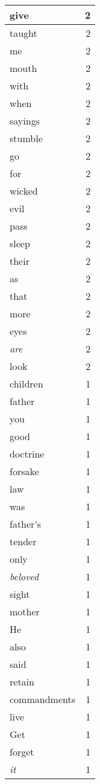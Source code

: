 \begin{center}
\begin{longtable}{l|r}
give & 2\\ \hline 
taught & 2\\ \hline 
me & 2\\ \hline 
mouth & 2\\ \hline 
with & 2\\ \hline 
when & 2\\ \hline 
sayings & 2\\ \hline 
stumble & 2\\ \hline 
go & 2\\ \hline 
for & 2\\ \hline 
wicked & 2\\ \hline 
evil & 2\\ \hline 
pass & 2\\ \hline 
sleep & 2\\ \hline 
their & 2\\ \hline 
as & 2\\ \hline 
that & 2\\ \hline 
more & 2\\ \hline 
eyes & 2\\ \hline 
\emph{are} & 2\\ \hline 
look & 2\\ \hline 
children & 1\\ \hline 
father & 1\\ \hline 
you & 1\\ \hline 
good & 1\\ \hline 
doctrine & 1\\ \hline 
forsake & 1\\ \hline 
law & 1\\ \hline 
was & 1\\ \hline 
father's & 1\\ \hline 
tender & 1\\ \hline 
only & 1\\ \hline 
\emph{beloved} & 1\\ \hline 
sight & 1\\ \hline 
mother & 1\\ \hline 
He & 1\\ \hline 
also & 1\\ \hline 
said & 1\\ \hline 
retain & 1\\ \hline 
commandments & 1\\ \hline 
live & 1\\ \hline 
Get & 1\\ \hline 
forget & 1\\ \hline 
\emph{it} & 1\\ \hline 

\end{longtable}
\end{center}
